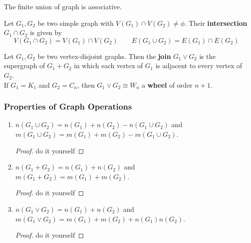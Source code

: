 \begin{remark}
	The finite union of graph is associative.
\end{remark}

\begin{definition}
	Let $G_1,G_2$ be two simple graph with $V(G_1) \cap V(G_2) \ne \phi$.
	Their \textbf{intersection} $G_1 \cap G_2$ is given by 
	$$ V(G_1 \cap G_2) = V(G_1) \cap V(G_2) \qquad E(G_1 \cup G_2) = E(G_1) \cap E(G_2) $$
\end{definition}

\begin{definition}
	Let $G_1,G_2$ be two vertex-disjoint graphs. Then the \textbf{join} $G_1 \vee G_2$ is the supergraph of $G_1 + G_2$ in which each vertex of $G_1$ is adjacent to every vertex of $G_2$.\\

	If $G_1 = K_1$ and $G_2 = C_n$, then $G_1 \vee G_2 \cong W_n$ a \textbf{wheel} of order $n+1$.
\end{definition}

\subsubsection{Properties of Graph Operations}
\begin{enumerate}
	\item $n(G_1 \cup G_2) = n(G_1) + n(G_2) - n(G_1 \cup G_2)$ and\\
		$m(G_1 \cup G_2) = m(G_1) + m(G_2) - m(G_1 \cup G_2)$.
		\begin{proof}
			do it yourself
		\end{proof}
	\item $n(G_1+G_2) = n(G_1) + n(G_2)$ and \\ $m(G_1+G_2) = m(G_1) + m(G_2)$.
		\begin{proof}
			do it yourself
		\end{proof}
	\item $n(G_1 \vee G_2) = n(G_1)+n(G_2)$ and \\ $m(G_1 \vee G_2) = m(G_1)+m(G_2)+n(G_1)n(G_2)$.
		\begin{proof}
			do it yourself
		\end{proof}
\end{enumerate}

